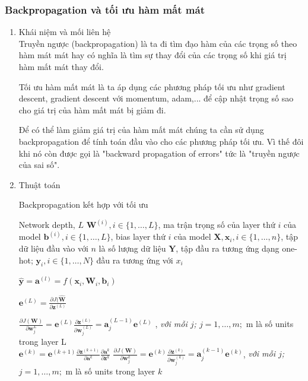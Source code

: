 \subsubsection{Backpropagation và tối ưu hàm mất mát}
\begin{enumerate}
\item {Khái niệm và mối liên hệ}\\
\hspace{5mm} Truyền ngược (backpropagation) là ta đi tìm đạo hàm của các trọng số theo hàm mát mát hay có nghĩa là tìm sự thay đổi của các trọng số khi giá trị hàm mất mát thay đổi. \par 
\hspace{5mm} Tối ưu hàm mất mát là ta áp dụng các phương pháp tối ưu như gradient descent, gradient descent với momentum, adam,... để cập nhật trọng số sao cho giá trị của hàm mất mát bị giảm đi.\par
\hspace{5mm} Để có thể làm giảm giá trị của hàm mất mát chúng ta cần sử dụng backpropagation để tính toán đầu vào cho các phương pháp tối ưu. Vì thế đôi khi nó còn được gọi là "backward propagation of errors" tức là "truyền ngược của sai số".

\item {Thuật toán}\\
\begin{algorithm}[H]
\caption{Backpropagation kết hợp với tối ưu}
\label{al:backward}
\begin{algorithmic}[1]
\REQUIRE Network depth, $L$
\REQUIRE $\textbf{W}^{(i)}, i \in \{1,\ldots,L \}$, ma trận trọng số của layer thứ $i$ của model
\REQUIRE $\textbf{b}^{(i)}, i \in \{1,\ldots,L \}$, bias layer thứ $i$ của model	
\REQUIRE $\textbf{X}, \textbf{x}_i, i \in \{1,\ldots,n \} $, tập dữ liệu đầu vào với $n$ là số lượng dữ liệu
\REQUIRE $\textbf{Y}$, tập đầu ra tương ứng dạng one-hot; $\textbf{y}_i, i\in \{1,\ldots,N\}$ đầu ra tương ứng với $x_i$

\STATE $\widehat{\textbf{y}} = \textbf{a}^{(l)}= f(\textbf{x}_{i},\textbf{W}_{i},\textbf{b}_{i})$

\STATE	$\textbf{e}^{(L)} = \frac{\partial J(\widehat{\textbf{W}}}{\partial \textbf{z}^{(L)}}$

\STATE $\frac{\partial J(\textbf{W})}{\partial \textbf{w}^{L}_j} = \textbf{e}^{(L)} \frac{\partial \textbf{z}^{(L)}}{\partial \textbf{w}^{(L)}_j} = \textbf{a}^{(L-1)}_{j}\textbf{e}^{(L)}$ , \textit{với mỗi $j$; $j =1,\ldots, m;$} m là số units trong layer L \\
		\STATE $\textbf{e}^{(k)}= \textbf{e}^{(k+1)} \frac{\partial  {\textbf{z}^{(k+1)}}}{\partial \textbf{a}^{k}} \frac{\partial\textbf{a}^{k}}{\partial\textbf{z}^{k}} $
		\STATE $\frac{\partial J(\textbf{W})}{\partial \textbf{w}^{k}_j}  =\textbf{e}^{(k)} \frac{\partial \textbf{z}^{(k)}}{\partial \textbf{w}^{(k)}_j} = \textbf{a}^{(k-1)}_{j}\textbf{e}^{(k)}$,  \textit{với mỗi $j$; $j =1,\ldots, m;$} m là số units trong layer $k$ \\
		

\end{algorithmic}
\end{algorithm}
\end{enumerate}

